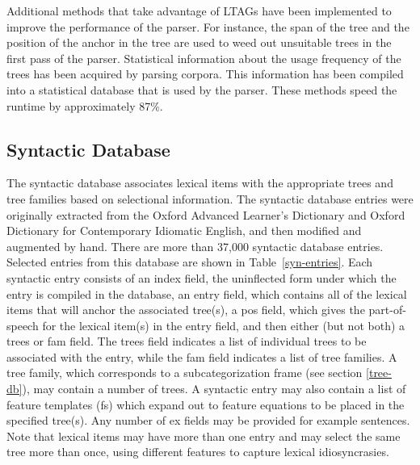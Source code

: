\noindent
Additional methods that take advantage of LTAGs have been implemented
to improve the performance of the parser.  For instance, the span of
the tree and the position of the anchor in the tree are used to weed
out unsuitable trees in the first pass of the parser.  Statistical
information about the usage frequency of the trees has been acquired
by parsing corpora. This information has been compiled into a
statistical database that is used by the parser. These methods speed the
runtime by approximately 87\%.

\subsection{Syntactic Database}

The syntactic database associates lexical items with the appropriate
trees and tree families based on selectional information.  The
syntactic database entries were originally extracted from the Oxford
Advanced Learner's Dictionary and Oxford Dictionary for Contemporary
Idiomatic English, and then modified and augmented by hand.  There are
more than 37,000 syntactic database entries.  Selected entries from this database
are shown in Table~\ref{syn-entries}.
\noindent
Each syntactic entry consists of an {\sc index} field, the uninflected
form under which the entry is compiled in the database, an {\sc entry}
field, which contains all of the lexical items that will anchor the
associated tree(s), a {\sc pos} field, which gives the part-of-speech
for the lexical item(s) in the {\sc entry} field, and then either (but
not both) a {\sc trees} or {\sc fam} field.  The {\sc trees} field
indicates a list of individual trees to be associated with the entry,
while the {\sc fam} field indicates a list of tree families. A tree family,
which corresponds to a subcategorization frame (see section \ref{tree-db}),
may contain a number of trees.  A syntactic entry
may also contain a list of feature templates ({\sc fs}) which expand out to
feature equations to be placed in the specified tree(s). Any number of
{\sc ex} fields may be provided for example sentences. Note that lexical items
may have more than one entry and may select the same tree more than once, using
different features to capture lexical idiosyncrasies.\\

